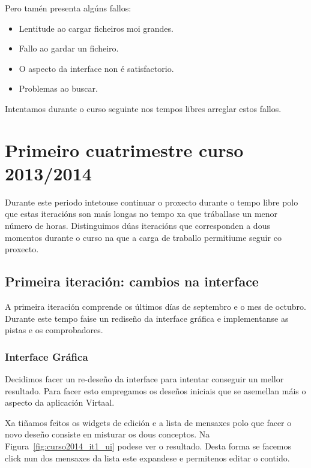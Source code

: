 Pero tamén presenta algúns fallos:

\begin{itemize}
  \item Lentitude ao cargar ficheiros moi grandes.
  \item Fallo ao gardar un ficheiro.
  \item O aspecto da interface non é satisfactorio.
  \item Problemas ao buscar.
\end{itemize}

Intentamos durante o curso seguinte nos tempos libres arreglar estos fallos.

\section{Primeiro cuatrimestre curso 2013/2014}

Durante este periodo intetouse continuar o proxecto durante o tempo libre polo que estas iteracións son maís longas no tempo xa que tráballase un menor número de horas. Distinguimos dúas iteracións que corresponden a dous momentos durante o curso na que a carga de traballo permitiume seguir co proxecto.

\subsection{Primeira iteración: cambios na interface}
A primeira iteración comprende os últimos días de septembro e o mes de octubro. Durante este tempo faise un rediseño da interface gráfica e implementanse as pistas e os comprobadores.

\subsubsection{Interface Gráfica}
Decidimos facer un re-deseño da interface para intentar conseguir un mellor resultado. Para facer esto empregamos os deseños iniciais que se asemellan máis o aspecto da aplicación Virtaal.

Xa tiñamos feitos os widgets de edición e a lista de mensaxes polo que facer o novo deseño consiste en misturar os dous conceptos. Na Figura~\ref{fig:curso2014_it1_ui} podese ver o resultado. Desta forma se facemos click nun dos mensaxes da lista este expandese e permitenos editar o contido.


